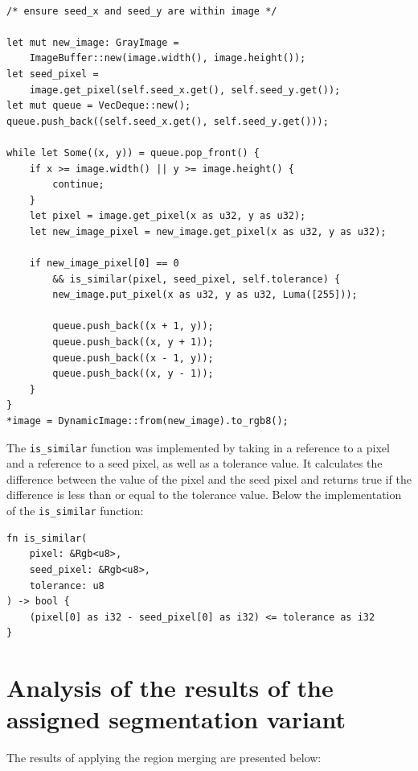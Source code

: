 \documentclass[12pt]{article}
\begin{document}
\begin{lstlisting}
    
/* ensure seed_x and seed_y are within image */

let mut new_image: GrayImage = 
    ImageBuffer::new(image.width(), image.height());
let seed_pixel = 
    image.get_pixel(self.seed_x.get(), self.seed_y.get());
let mut queue = VecDeque::new();
queue.push_back((self.seed_x.get(), self.seed_y.get()));

while let Some((x, y)) = queue.pop_front() {
    if x >= image.width() || y >= image.height() {
        continue;
    }
    let pixel = image.get_pixel(x as u32, y as u32);
    let new_image_pixel = new_image.get_pixel(x as u32, y as u32);

    if new_image_pixel[0] == 0 
        && is_similar(pixel, seed_pixel, self.tolerance) {
        new_image.put_pixel(x as u32, y as u32, Luma([255]));

        queue.push_back((x + 1, y));
        queue.push_back((x, y + 1));
        queue.push_back((x - 1, y));
        queue.push_back((x, y - 1));
    }
}
*image = DynamicImage::from(new_image).to_rgb8();
\end{lstlisting}

The \lstinline{is_similar} function was implemented by taking in a reference to a pixel
and a reference to a seed pixel,
as well as a tolerance value.
It calculates the difference between the value of the pixel
and the seed pixel and returns true if the difference is less than or equal
to the tolerance value. Below the implementation of the \lstinline{is_similar} function:

\begin{lstlisting}
fn is_similar(
    pixel: &Rgb<u8>, 
    seed_pixel: &Rgb<u8>, 
    tolerance: u8
) -> bool {
    (pixel[0] as i32 - seed_pixel[0] as i32) <= tolerance as i32
}
\end{lstlisting}

\section{Analysis of the results of the assigned segmentation variant}

The results of applying the region merging are presented below:
\end{document}
